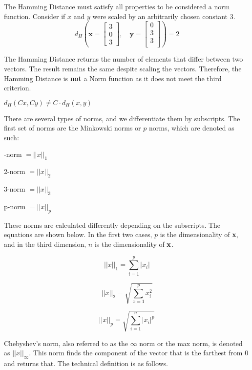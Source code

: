 The Hamming Distance must satisfy all properties to be considered a norm function. Consider if $x$ and $y$ were scaled by an arbitrarily chosen constant $3$.
\[
d_H \left( \mathbf{{x}} = 
\begin{bmatrix}
    3 \\
    0 \\
    3 
\end{bmatrix}, 
\quad
\mathbf{{y}} = 
\begin{bmatrix}
    0 \\
    3 \\
    3 \\
\end{bmatrix} \right) = 2
\]

The Hamming Distance returns the number of elements that differ between two vectors. The result remains the same despite scaling the vectors. Therefore, the Hamming Distance is \textbf{not} a Norm function as it does not meet the third criterion.

\centering
$d_{H}(Cx,Cy) \ne C \cdot d_{H}(x,y)$

\raggedright

There are several types of norms, and we differentiate them by subscripts. The first set of norms are the Minkowski norms or $p$ norms, which are denoted as such:

-norm $= ||x||_1$

2-norm $= ||x||_2$

3-norm $= ||x||_3$

p-norm $= ||x||_p$

\raggedright

These norms are calculated differently depending on the subscripts. The equations are shown below. In the first two cases, $p$ is the dimensionality of {\bf x}, and in the third dimension, $n$ is the dimensionality of ${\bf x}$.

\centering
$$||x||_1 = \sum_{i=1}^{p}|x_i|$$

$$||x||_2 = \sqrt{\sum_{x=1}^{p}x_i^2}$$

$$||x||_p = \sqrt{\sum_{i=1}^{n}|x_i|^p}$$

\raggedright

Chebyshev's norm, also referred to as the $\infty$ norm or the max norm, is denoted as $||x||_\infty$. This norm finds the component of the vector that is the farthest from 0 and returns that. The technical definition is as follows.

